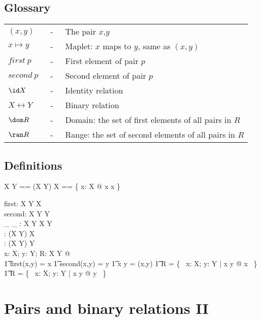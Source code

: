 \documentclass{article}
\begin{document}
\subsection*{Glossary}

\begin{tabular}{l c l}
$(x,y)$	  & ~-~ & The pair $x$,$y$ \\
$x \mapsto y$ & ~-~ & Maplet: $x$ maps to $y$, same as $(x,y)$ \\
$first~p$ & ~-~ & First element of pair $p$ \\
$second~p$ & ~-~ & Second element of pair $p$ \\
$\id X$ & ~-~ & Identity relation \\
$X \rel Y$ & ~-~ & Binary relation \\
$\dom R$ & ~-~ & Domain: the set of first elements of all pairs in $R$ \\
$\ran R$ & ~-~ & Range: the set of second elements of all pairs in $R$ \\
\end{tabular}

\subsection*{Definitions}

\begin{zed} 
	X \rel Y == \power (X \cross Y)
\also
	\id X == \{ x: X @ x \mapsto x \}
\end{zed}

\begin{gendef}[X,Y]
	first: X \cross Y \fun X \\
	second: X \cross Y \fun Y \\
	\_ \mapsto \_ : X \cross Y \fun X \cross Y \\
	\dom: (X \rel Y) \fun \power X \\
	\ran: (X \rel Y) \fun \power Y \\
\where
	\forall x: X; y: Y; R: X \rel Y @ \\
\also
\t1	first(x,y) = x \land
\also
\t1	second(x,y) = y \land
\also
\t1	x \mapsto y = (x,y) \land
\also
\t1	\dom R = \{~ x: X; y: Y | x  y @ x ~\} \land	
\also
\t1	\ran R = \{~ x: X; y: Y | x  y @ y ~\}
\also
\end{gendef}

\newpage

\section*{Pairs and binary relations II}
\end{document}
